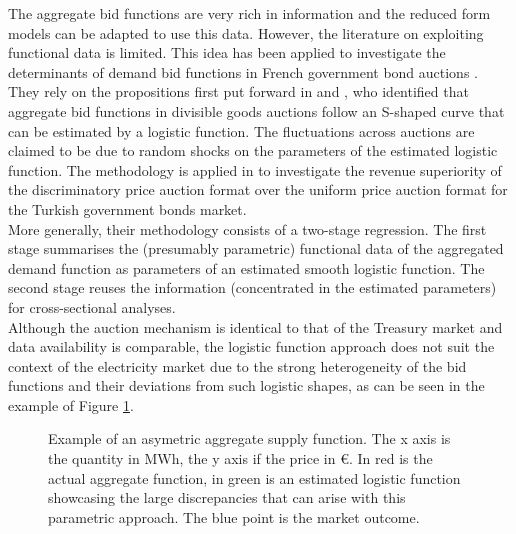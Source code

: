 The aggregate bid functions are very rich in information and the reduced form models can be adapted to use this data. However, the literature on exploiting functional data is limited. This idea has been applied to investigate the determinants of demand bid functions in French government bond auctions \cite{preget2005treasury}. They rely on the propositions first put forward in \cite{boukai1998market} and \cite{berg1999bid}, who identified that aggregate bid functions in divisible goods auctions follow an S-shaped curve that can be estimated by a logistic function. The fluctuations across auctions are claimed to be due to random shocks on the parameters of the estimated logistic function. The methodology is applied in \cite{ozcan2004logistic} to investigate the revenue superiority of the discriminatory price auction format over the uniform price auction format for the Turkish government bonds market.\\

More generally, their methodology consists of a two-stage regression. The first stage summarises the (presumably parametric) functional data of the aggregated demand function as parameters of an estimated smooth logistic function. The second stage reuses the information (concentrated in the estimated parameters) for cross-sectional analyses.\\

Although the auction mechanism is identical to that of the Treasury market and data availability is comparable, the logistic function approach does not suit the context of the electricity market due to the strong heterogeneity of the bid functions and their deviations from such logistic shapes, as can be seen in the example of Figure \ref{assymetry}. \\

\begin{figure}[!ht]
\begin{center}  \end{center}
\caption{Example of an asymetric aggregate supply function. The x axis is the quantity in MWh, the y axis if the price in €. In red is the actual aggregate function, in green is an estimated logistic function showcasing the large discrepancies that can arise with this parametric approach. The blue point is the market outcome. }
\label{assymetry}
\end{figure}

